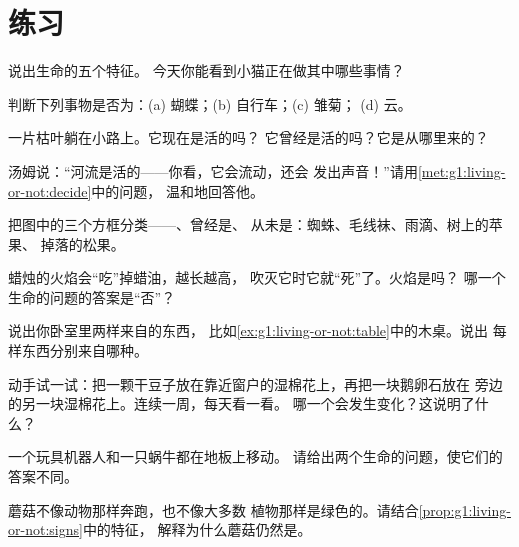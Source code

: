 \section{练习}

\begin{exercise}[$\star$]\label{exo:g1:living-or-not:1}
说出生命的五个特征。
今天你能看到小猫正在做其中哪些事情？
\end{exercise}

\begin{exercise}[$\star$]\label{exo:g1:living-or-not:2}
判断下列事物是否为：(a) 蝴蝶；(b) 自行车；(c) 雏菊；
(d) 云。
\end{exercise}

\begin{exercise}[$\star$]\label{exo:g1:living-or-not:3}
一片枯叶躺在小路上。它现在是活的吗？
它曾经是活的吗？它是从哪里来的？
\end{exercise}

\begin{exercise}[$\star$]\label{exo:g1:living-or-not:4}
汤姆说：“河流是活的——你看，它会流动，还会
发出声音！”请用\cref{met:g1:living-or-not:decide}中的问题，
温和地回答他。
\end{exercise}

\begin{exercise}[$\star$]\label{exo:g1:living-or-not:5}
把图中的三个方框分类——、曾经是、
从未是：蜘蛛、毛线袜、雨滴、树上的苹果、
掉落的松果。
\end{exercise}

\begin{exercise}[$\star$]\label{exo:g1:living-or-not:6}
蜡烛的火焰会“吃”掉蜡油，越长越高，
吹灭它时它就“死”了。火焰是吗？
哪一个生命的问题的答案是“否”？
\end{exercise}

\begin{exercise}[$\star$]\label{exo:g1:living-or-not:7}
说出你卧室里两样来自的东西，
比如\cref{ex:g1:living-or-not:table}中的木桌。说出
每样东西分别来自哪种。
\end{exercise}

\begin{exercise}[$\star$]\label{exo:g1:living-or-not:8}
动手试一试：把一颗干豆子放在靠近窗户的湿棉花上，再把一块鹅卵石放在
旁边的另一块湿棉花上。连续一周，每天看一看。
哪一个会发生变化？这说明了什么？
\end{exercise}

\begin{exercise}[$\star\star$]\label{exo:g1:living-or-not:9}
一个玩具机器人和一只蜗牛都在地板上移动。
请给出两个生命的问题，使它们的答案不同。
\end{exercise}

\begin{exercise}[$\star\star$]\label{exo:g1:living-or-not:10}
蘑菇不像动物那样奔跑，也不像大多数
植物那样是绿色的。请结合\cref{prop:g1:living-or-not:signs}中的特征，
解释为什么蘑菇仍然是。
\end{exercise}
